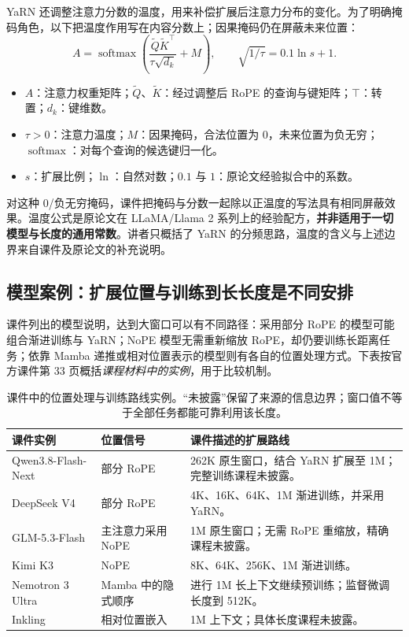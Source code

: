 \documentclass[11pt,a4paper]{article}
\begin{document}
YaRN 还调整注意力分数的温度，用来补偿扩展后注意力分布的变化。为了明确掩码角色，以下把温度作用写在内容分数上；因果掩码仍在屏蔽未来位置：
$$
A=\operatorname{softmax}\!\left(
\frac{\widetilde Q\widetilde K^{\top}}{\tau\sqrt{d_k}}+M
\right),
\qquad
\sqrt{1/\tau}=0.1\ln s+1.
$$
\begin{itemize}
  \item $A$：注意力权重矩阵；$\widetilde Q$、$\widetilde K$：经过调整后 RoPE 的查询与键矩阵；$\top$：转置；$d_k$：键维数。
  \item $\tau>0$：注意力温度；$M$：因果掩码，合法位置为 0，未来位置为负无穷；$\operatorname{softmax}$：对每个查询的候选键归一化。
  \item $s$：扩展比例；$\ln$：自然对数；$0.1$ 与 $1$：原论文经验拟合中的系数。
\end{itemize}

对这种 0/负无穷掩码，课件把掩码与分数一起除以正温度的写法具有相同屏蔽效果。温度公式是原论文在 LLaMA/Llama 2 系列上的经验配方，\textbf{并非适用于一切模型与长度的通用常数}。讲者只概括了 YaRN 的分频思路，温度的含义与上述边界来自课件及原论文的补充说明。

\subsection{模型案例：扩展位置与训练到长长度是不同安排}

课件列出的模型说明，达到大窗口可以有不同路径：采用部分 RoPE 的模型可能组合渐进训练与 YaRN；NoPE 模型无需重新缩放 RoPE，却仍要训练长距离任务；依靠 Mamba 递推或相对位置表示的模型则有各自的位置处理方式。下表按官方课件第 33 页概括\emph{课程材料中的实例}，用于比较机制。

\begin{table}[H]
\centering
\small
\begin{tabularx}{\textwidth}{@{}p{3.2cm}XX@{}}
\toprule
课件实例 & 位置信号 & 课件描述的扩展路线 \\
\midrule
Qwen3.8-Flash-Next & 部分 RoPE & 262K 原生窗口，结合 YaRN 扩展至 1M；完整训练课程未披露。 \\
DeepSeek V4 & 部分 RoPE & 4K、16K、64K、1M 渐进训练，并采用 YaRN。 \\
GLM-5.3-Flash & 主注意力采用 NoPE & 1M 原生窗口；无需 RoPE 重缩放，精确课程未披露。 \\
Kimi K3 & NoPE & 8K、64K、256K、1M 渐进训练。 \\
Nemotron 3 Ultra & Mamba 中的隐式顺序 & 进行 1M 长上下文继续预训练；监督微调长度到 512K。 \\
Inkling & 相对位置嵌入 & 1M 上下文；具体长度课程未披露。 \\
\bottomrule
\end{tabularx}
\caption{课件中的位置处理与训练路线实例。“未披露”保留了来源的信息边界；窗口值不等于全部任务都能可靠利用该长度。}
\end{table}
\end{document}

